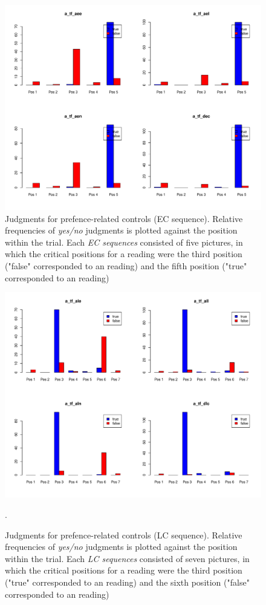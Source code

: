 \documentclass[fleqn,reqno,10pt,draft]{article}
\newcommand{\lc}{\acro{lc}}
\newcommand{\ec}{\acro{ec}}
\begin{document}
\begin{figure}
\includegraphics[width=\textwidth]{../pictures/paper/graph_ec.pdf}
\caption{Judgments for prefence-related controls (EC sequence). Relative frequencies
of {\it yes/no} judgments is plotted against the position within the
trial. Each {\it EC sequences} consisted of five pictures, in which the
critical positions for a reading were the third position ("false" corresponded
to an \ec reading) and the fifth position ("true" corresponded to an \lc reading)}
\label{Fig:EC_judgments}
\end{figure}


\begin{figure}
\includegraphics[width=\textwidth]{../pictures/paper/graph_lc.pdf}
\caption{Judgments for prefence-related controls (LC sequence). Relative frequencies
of {\it yes/no} judgments is plotted against the position within the
trial. Each {\it LC sequences} consisted of seven pictures, in which the
critical positions for a reading were the third position ("true" corresponded
to an \lc reading) and the sixth position ("false" corresponded to an \ec reading)}
\label{Fig:LC_judgments}.
\end{figure}
\end{document}
